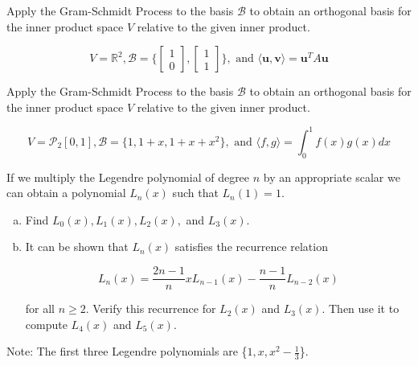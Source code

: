 \documentclass[11pt,letterpaper,boxed]{pset}
\begin{document}
    
    \begin{problem} [7.1 \#38]
    	Apply the Gram-Schmidt Process to the basis $\mathscr{B}$ to obtain an orthogonal basis for the inner product space $V$ relative to the given inner product.
    
    	\[ V= \mathbb{R}^2, \mathscr{B} = 
    		\{\begin{bmatrix} 1 \\ 0 \end{bmatrix}, 
    		\begin{bmatrix} 1 \\ 1 \end{bmatrix} \},
    	\text{ and } 
    	\langle \textbf{u}, \textbf{v} \rangle = 
    	    \textbf{u}^T A\textbf{u} \]
    
    \end{problem}
    \begin{solution}
    \vspace{\fill}
    \end{solution}
    \clearpage 
    
    
    \begin{problem} [7.1 \#40]
    	Apply the Gram-Schmidt Process to the basis $\mathscr{B}$ to obtain an orthogonal basis for the inner product space $V$ relative to the given inner product.
    
    	\[ V=\mathscr{P}_2[0,1], \mathscr{B} = \{1,1+x,1+x+x^2\}, \text{ and }
    		\langle f, g \rangle = \int_0^1 f(x)g(x) dx \]
    
    \end{problem}
    \begin{solution}
    \vspace{\fill}
    \end{solution}
    \clearpage 
    
    
    \begin{problem} [7.1 \#42]
    	If we multiply the Legendre polynomial of degree $n$ by an appropriate scalar we can obtain a polynomial $L_n(x)$ such that $L_n(1) = 1$.
    	
    	\begin{enumerate} [(a)]
    	    \item Find $L_0(x),L_1(x),L_2(x),$ and $L_3(x)$.
    	    \item It can be shown that $L_n(x)$ satisfies the recurrence relation
    	    
    	    \[ L_n(x) = \frac{2n - 1}{n}xL_{n-1}(x) - \frac{n-1}{n}L_{n-2}(x) \]
    
    		for all $n \geq 2$. Verify this recurrence for $L_2(x)$ and $L_3(x)$. Then use it to compute $L_4(x)$ and $L_5(x)$.
    	\end{enumerate}
    	
    	Note: The first three Legendre polynomials are \{$1, x, x^2 - \frac{1}{3}$\}.
    	
    \end{problem}
    \begin{solution}
    \vspace{\fill}
    
    \end{solution}
    \clearpage 
    
\end{document}
